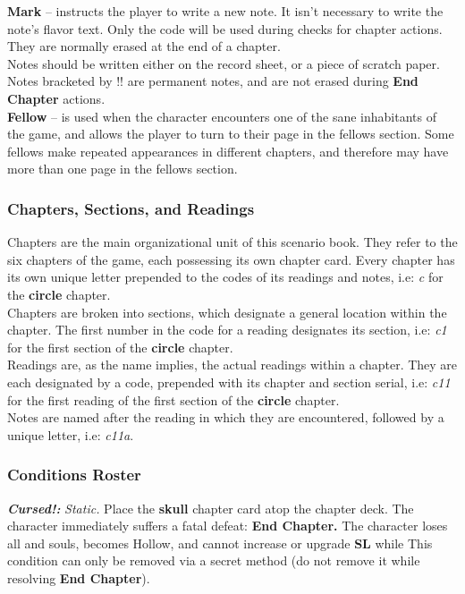 \documentclass[12pt]{article}
\begin{document}
\begin{multicols*}{2}
\columnbreak

\textbf{Mark} -- instructs the player to write a new note. It isn’t necessary to write the note’s flavor text. Only the code will be used during checks for chapter actions. They are normally erased at the end of a chapter.\\
Notes should be written either on the record sheet, or a piece of scratch paper.\\
Notes bracketed by !! are permanent notes, and are not erased during \textbf{End Chapter} actions.\\

\textbf{Fellow} -- is used when the character encounters one of the sane inhabitants of the game, and allows the player to turn to their page in the fellows section. Some fellows make repeated appearances in different chapters, and therefore may have more than one page in the fellows section.

\subsubsection{Chapters, Sections, and Readings}
Chapters are the main organizational unit of this scenario book. They refer to the six chapters of the game, each possessing its own chapter card. Every chapter has its own unique letter prepended to the codes of its readings and notes, i.e: \emph{c} for the \textbf{circle} chapter.\\
Chapters are broken into sections, which designate a general location within the chapter. The first number in the code for a reading designates its section, i.e: \emph{c1} for the first section of the \textbf{circle} chapter.\\
Readings are, as the name implies, the actual readings within a chapter. They are each designated by a code, prepended with its chapter and section serial, i.e: \emph{c11} for the first reading of the first section of the \textbf{circle} chapter.\\
Notes are named after the reading in which they are encountered, followed by a unique letter, i.e: \emph{c11a}.

\subsubsection{Conditions Roster}
\textbf{\emph{Cursed!:}} \hypertarget{Cursed!}{}\emph{Static.} Place the \textbf{skull} chapter card atop the chapter deck. The character immediately suffers a fatal defeat: \textbf{End Chapter.} The character loses all  and souls, becomes Hollow, and cannot increase  or upgrade \textbf{SL} while  This condition can only be removed via a secret method (do not remove it while resolving \textbf{End Chapter}).\\


\end{multicols*}
\end{document}
